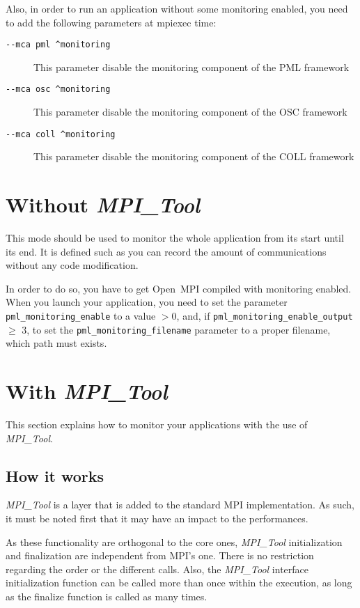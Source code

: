 \documentclass[notitlepage]{article}
\newcommand{\mpit}[1]{\textit{MPI\_Tool#1}}
\newcommand{\ompi}[0]{Open~MPI}
\newcommand{\brkunds}[0]{\allowbreak\_}
\begin{document}
Also, in order to run an application without some monitoring enabled,
you need to add the following parameters at mpiexec time:
\begin{description}
\item [\texttt{-{}-mca pml \^{}monitoring}] This parameter disable the
  monitoring component of the PML framework
\item [\texttt{-{}-mca osc \^{}monitoring}] This parameter disable the
  monitoring component of the OSC framework
\item [\texttt{-{}-mca coll \^{}monitoring}] This parameter disable
  the monitoring component of the COLL framework
\end{description}

\section{Without \mpit{}}

This mode should be used to monitor the whole application from its
start until its end. It is defined such as you can record the amount
of communications without any code modification.

In order to do so, you have to get \ompi{} compiled with monitoring
enabled. When you launch your application, you need to set the
parameter \texttt{pml\brkunds{}monitoring\brkunds{}enable} to a value
$> 0$, and, if
\texttt{pml\brkunds{}monitoring\brkunds{}enable\brkunds{}output} $\ge$
3, to set the \texttt{pml\brkunds{}monitoring\brkunds{}filename}
parameter to a proper filename, which path must exists.

\section{With \mpit{}}

This section explains how to monitor your applications with the use
of \mpit{}.

\subsection{How it works}

\mpit{} is a layer that is added to the standard MPI
implementation. As such, it must be noted first that it may have an
impact to the performances.

As these functionality are orthogonal to the core ones, \mpit{}
initialization and finalization are independent from MPI's one. There
is no restriction regarding the order or the different calls. Also,
the \mpit{} interface initialization function can be called more than
once within the execution, as long as the finalize function is called
as many times.
\end{document}
